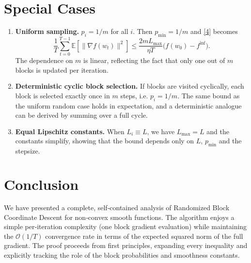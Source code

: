 \documentclass{article}
\newcommand{\E}{\mathbb{E}}
\begin{document}
\section*{Special Cases}
\begin{enumerate}[leftmargin=*]
\item \textbf{Uniform sampling.} $p_i=1/m$ for all $i$.  Then $p_{\min}=1/m$ and
\eqref{4} becomes
\[
\frac{1}{T}\sum_{t=0}^{T-1}\E[\|\nabla f(w_t)\|^{2}]
\le \frac{2mL_{\max}}{\eta T}\big(f(w_0)-f^{\inf}\big).
\]
The dependence on $m$ is linear, reflecting the fact that only one out of $m$
blocks is updated per iteration.

\item \textbf{Deterministic cyclic block selection.}  
If blocks are visited cyclically, each block is selected exactly once in $m$
steps, i.e. $p_i=1/m$.  The same bound as the uniform random case holds in
expectation, and a deterministic analogue can be derived by summing over a
full cycle.

\item \textbf{Equal Lipschitz constants.}  When $L_i\equiv L$, we have
$L_{\max}=L$ and the constants simplify, showing that the bound depends only
on $L$, $p_{\min}$ and the stepsize.
\end{enumerate}

\section*{Conclusion}
We have presented a complete, self‑contained analysis of Randomized Block
Coordinate Descent for non‑convex smooth functions.  The algorithm enjoys a
simple per‑iteration complexity (one block gradient evaluation) while
maintaining the $\mathcal{O}(1/T)$ convergence rate in terms of the expected
squared norm of the full gradient.  The proof proceeds from first principles,
expanding every inequality and explicitly tracking the role of the block
probabilities and smoothness constants.
\end{document}
